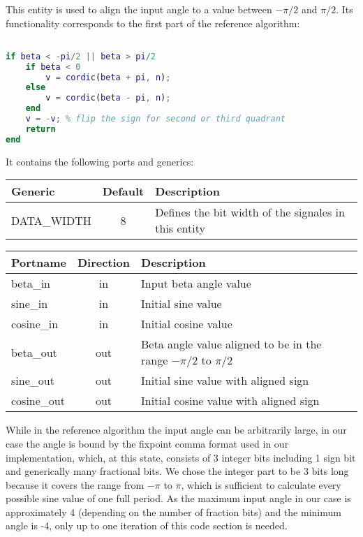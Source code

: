 This entity is used to align the input angle to a value between \(-\pi/2\) and \(\pi/2\). Its functionality corresponds to the first part of the reference algorithm:

\begin{lstlisting}[language=Matlab]

if beta < -pi/2 || beta > pi/2
	if beta < 0
		v = cordic(beta + pi, n);
	else
		v = cordic(beta - pi, n);
	end
	v = -v; % flip the sign for second or third quadrant
	return
end

\end{lstlisting}

It contains the following ports and generics: 

\begin{center}
	\begin{tabular}{ | l | c | l | }
		\hline
		\textbf{Generic} & \textbf{Default} & \textbf{Description} \\
		\hline
		DATA\_WIDTH & 8 & Defines the bit width of the signales in this entity \\
		\hline
	\end{tabular} 
\end{center}

\begin{center}
	\begin{tabular}{ | l | c | l | }
		\hline
		\textbf{Portname} & \textbf{Direction} & \textbf{Description} \\
		\hline
		beta\_in & in & Input beta angle value \\
		sine\_in & in  & Initial sine value \\
		cosine\_in & in  & Initial cosine value \\
		beta\_out & out  & Beta angle value aligned to be in the range \(-\pi/2\) to \(\pi/2\) \\
		sine\_out & out  & Initial sine value with aligned sign \\
		cosine\_out & out  & Initial cosine value with aligned sign \\
		\hline
	\end{tabular} 
\end{center}

While in the reference algorithm the input angle can be arbitrarily large, in our case the angle is bound by the fixpoint comma format used in our implementation, which, at this state, consists of 3 integer bits including 1 sign bit and generically many fractional bits. We chose the integer part to be 3 bits long because it covers the range from \(-\pi\) to \(\pi\), which is sufficient to calculate every possible sine value of one full period. As the maximum input angle in our case is approximately 4 (depending on the number of fraction bits) and the minimum angle is -4, only up to one iteration of this code section is needed.


